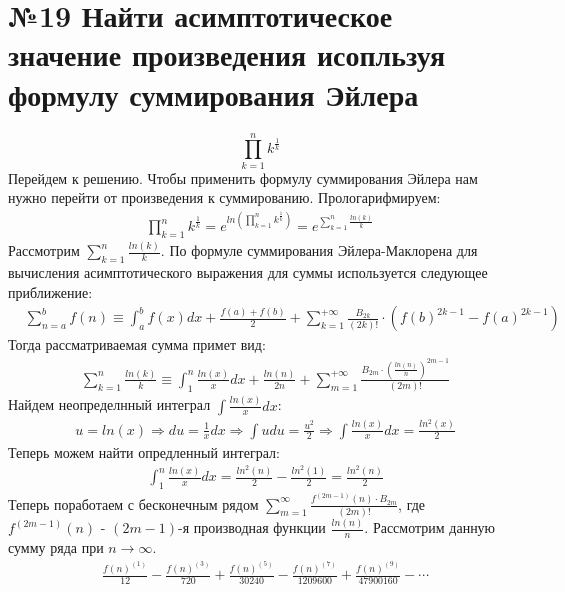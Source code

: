 \documentclass[a4paper,12pt,numbers=noenddot]{scrreprt}
\begin{document}
\section{№19 Найти асимптотическое значение произведения исопльзуя формулу суммирования Эйлера}

\begin{flushleft}
    \begin{equation}
    \prod_{k=1}^{n} k^\frac{1}{k}
    \end{equation}
    Перейдем к решению. Чтобы применить формулу суммирования Эйлера нам нужно перейти от произведения к суммированию. Прологарифмируем:
    \begin{align}
    \prod_{k=1}^{n} k^\frac{1}{k}=e^{ln(\prod_{k=1}^{n} k^\frac{1}{k})} = e^{\sum_{k=1}^{n} \frac{ln(k)}{k}}
    \end{align}
    Рассмотрим $\sum_{k=1}^{n} \frac{ln(k)}{k}$. По формуле суммирования Эйлера-Маклорена для вычисления асимптотического выражения для суммы используется следующее приближение:
    \begin{align}
    & \sum_{n=a}^b f(n) \equiv \int_a^b f(x)dx + \frac{f(a)+f(b)}{2}+\sum_{k=1}^{+\infty} \frac{B_{2k}}{(2k)!} \cdot (f(b)^{2k-1}-f(a)^{2k-1})
    \end{align}
    Тогда рассматриваемая сумма примет вид:
    \begin{align}
    & \sum_{k=1}^{n} \frac{ln(k)}{k} \equiv \int_1^n \frac{ln(x)}{x}dx + \frac{ln(n)}{2n} + \sum_{m=1}^{+\infty} \frac{B_{2m}\cdot (\frac{ln(n)}{n})^{2m-1}}{(2m)!}
    \end{align}
    Найдем неопределнный интеграл $\int \frac{ln(x)}{x}dx$:
    \begin{align}
    & u=ln(x) \Rightarrow du = \frac{1}{x} dx \Rightarrow \int u du = \frac{u^2}{2} \Rightarrow \int \frac{ln(x)}{x}dx = \frac{ln^2(x)}{2}
    \end{align}
    Теперь можем найти опредленный интеграл:
    \begin{align}
    & \int_1^n \frac{ln(x)}{x}dx = \frac{ln^2(n)}{2}-\frac{ln^2(1)}{2} = \frac{ln^2(n)}{2}
    \end{align}
    Теперь поработаем с бесконечным рядом $\sum_{m=1}^\infty \frac{f^{(2m-1)}(n) \cdot B_{2m}}{(2m)!}$, где $f^{(2m-1)}(n)$ - $(2m-1)$-я производная функции $\frac{ln(n)}{n}$. Рассмотрим данную сумму ряда при $n \rightarrow \infty$.
    \begin{align}
    & \frac{f(n)^{(1)}}{12} - \frac{f(n)^{(3)}}{720} + \frac{f(n)^{(5)}}{30240} - \frac{f(n)^{(7)}}{1209600} + \frac{f(n)^{(9)}}{47900160} - \cdots

\end{align}
\end{flushleft}
\end{document}
